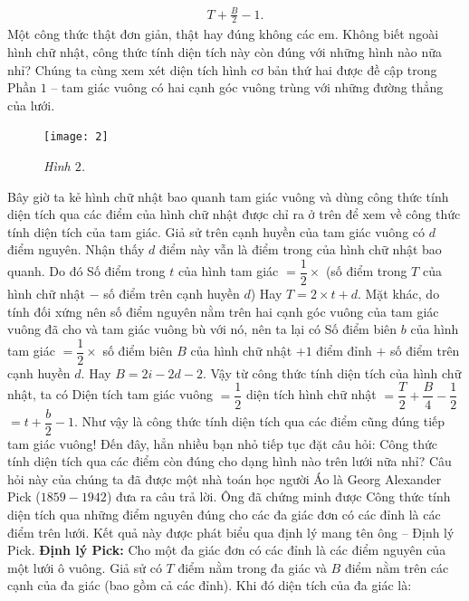 \begin{multicols}{2}
	\begin{align*}
		T+  \frac{B}{2} - 1.
	\end{align*}
	Một công thức thật đơn giản, thật hay đúng không các em. Không biết ngoài hình chữ nhật, công thức tính diện tích này còn đúng với những hình nào nữa nhỉ?
	\vskip 0.1cm
	Chúng ta cùng xem xét diện tích hình cơ bản thứ hai được đề cập trong Phần $1$ -- tam giác vuông có hai cạnh góc vuông trùng với những đường thẳng của lưới.
	\begin{figure}[H]
		\vspace*{-5pt}
		\centering
		\captionsetup{labelformat= empty, justification=centering}
		\texttt{[image: 2]}
		\caption{\small\textit{\color{toancuabi}Hình $2$.}}
		\vspace*{-10pt}
	\end{figure}
	Bây giờ ta kẻ hình chữ nhật bao quanh tam giác vuông và dùng công thức tính diện tích qua các điểm của hình chữ nhật được chỉ ra ở trên để xem về công thức tính diện tích của tam giác.
	\vskip 0.1cm
	Giả sử trên cạnh huyền của tam giác vuông có $d$ điểm nguyên. Nhận thấy $d$ điểm này vẫn là điểm trong của hình chữ nhật bao quanh. Do đó
	\vskip 0.1cm
	Số điểm trong $t$ của hình tam giác $= \dfrac{1}{2} \times $ (số điểm trong $T$ của hình chữ nhật $-$ số điểm trên cạnh huyền $d$)
	\vskip 0.1cm
	Hay $T = 2\times t + d$.
	\vskip 0.1cm
	Mặt khác, do tính đối xứng nên số điểm nguyên nằm trên hai cạnh góc vuông của tam giác vuông đã cho và tam giác vuông bù với nó, nên ta lại có
	\vskip 0.1cm
	Số điểm biên $b$ của hình tam giác $= \dfrac{1}{2} \times$ số điểm biên $B$ của hình chữ nhật 
	$+ 1$ điểm đỉnh $+$ số điểm trên cạnh huyền $d$.
	\vskip 0.1cm
	Hay $B = 2i - 2d - 2$.
	\vskip 0.1cm
	Vậy từ công thức tính diện tích của hình chữ nhật, ta có
	\vskip 0.1cm
	Diện tích tam giác vuông $= \dfrac{1}{2}$ diện tích hình chữ nhật
	$= \dfrac{T}{2} + \dfrac{B}{4} - \dfrac{1}{2}$
	$= t + \dfrac{b}{2} - 1$.
	\vskip 0.1cm
	Như vậy là công thức tính diện tích qua các điểm cũng đúng tiếp tam giác vuông! Đến đây, hẳn nhiều bạn nhỏ tiếp tục đặt câu hỏi: Công thức tính diện tích qua các điểm còn đúng cho dạng hình nào trên lưới nữa nhỉ? Câu hỏi này của chúng ta đã được một nhà toán học người Áo là Georg Alexander Pick ($1859 - 1942$) đưa ra câu trả lời. Ông đã chứng minh được Công thức tính diện tích qua những điểm nguyên đúng cho các đa giác đơn có các đỉnh là các điểm trên lưới. Kết quả này được phát biểu qua định lý mang tên ông -- Định lý Pick.
	\vskip 0.1cm
	\textbf{\color{toancuabi}Định lý Pick:} Cho một đa giác đơn có các đỉnh là các điểm nguyên của một lưới ô vuông. Giả sử có $T$ điểm nằm trong đa giác và $B$ điểm nằm trên các cạnh của đa giác (bao gồm cả các đỉnh). Khi đó diện tích của đa giác là:

\end{multicols}
